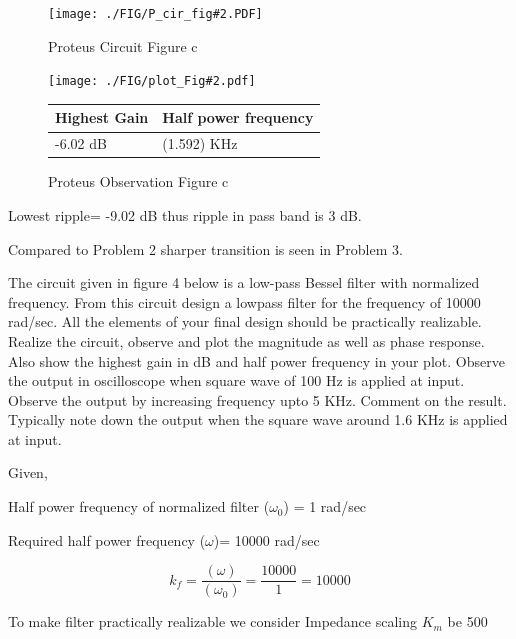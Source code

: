 \documentclass[a4paper,11pt]{article}
\newcommand{\Porcirobs}[4]{
    \begin{figure}[H] %
        \centering
        \texttt{[image: ./FIG/P\_cir\_fig\#2.PDF]}
        \caption{Proteus Circuit Figure #2}
    \end{figure}



    \begin{figure}[H]  %
        \centering
        \texttt{[image: ./FIG/plot\_Fig\#2.pdf]}
        \begin{tabular}[H]{| m{12em}| m{20em}|}
            \hline
            \rowcolor[rgb]{0.569,0.647,0.947} \textbf{Highest Gain } & \textbf{Half power frequency} \\ \hline
            #3 dB         & (#4) KHz     \\  \hline
        \end{tabular}
        \caption{Proteus Observation Figure #2}
    \end{figure}
}
\begin{document}

\Porcirobs{0.85}{c}{-6.02}{1.592}%

Lowest ripple= -9.02 dB thus ripple in pass band is 3 dB.

Compared to Problem 2 sharper transition is seen in Problem 3.


\begin{Q}
    {
        The circuit given in figure 4 below is a low-pass Bessel filter with normalized frequency. From
        this circuit design a lowpass filter for the frequency of 10000 rad/sec. All the elements of your
        final design should be practically realizable. Realize the circuit, observe and plot the magnitude as
        well as phase response. Also show the highest gain in dB and half power frequency in your plot.\newline
        Observe the output in oscilloscope when square wave of 100 Hz is applied at input. Observe the
        output by increasing frequency upto 5 KHz. Comment on the result.\newline
        Typically note down the output when the square wave around 1.6 KHz is applied at input.
    }
\end{Q}



Given,

Half power frequency of normalized filter ($\omega_0$) = 1 rad/sec

Required half power frequency ($\omega$)= 10000 rad/sec


\begin{equation*}
    k_f= \frac{(\omega)}{(\omega_0)} = \frac{10000}{1} = 10000
\end{equation*}

To make filter practically realizable we consider Impedance scaling $K_m$ be 500
\end{document}
